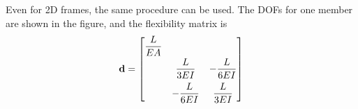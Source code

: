 \begin{example}[2D frame]
\leavevmode

\begin{minipage}{0.6\linewidth}
Even for 2D frames, the same procedure can be used. The DOFs for one member are shown in the figure, and the flexibility matrix is
\begin{equation*}
  \mathbf{d} = \begin{bmatrix}\dfrac{L}{EA} & & \\[6pt] & \dfrac{L}{3EI} & -\dfrac{L}{6EI}\\[8pt] & -\dfrac{L}{6EI} & \dfrac{L}{3EI}\end{bmatrix}
\end{equation*}
\end{minipage}\hfill
\begin{minipage}{0.35\linewidth}\centering\end{minipage}


\end{example}
